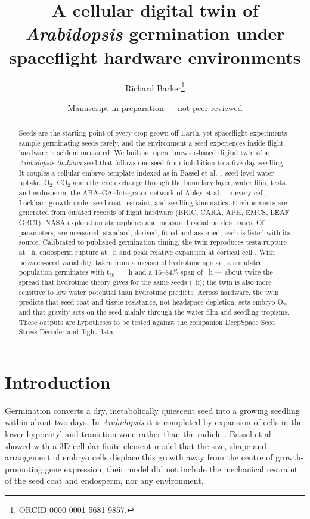 \documentclass[11pt]{article}
\title{A cellular digital twin of \emph{Arabidopsis} germination under spaceflight hardware environments}
\author{Richard Barker\thanks{ORCID 0000-0001-5681-9857. \todo{affiliation and correspondence address to be confirmed by the author}}}
\date{Manuscript in preparation --- not peer reviewed}
\begin{document}
\maketitle

\begin{abstract}
Seeds are the starting point of every crop grown off Earth, yet spaceflight experiments sample germinating seeds rarely, and the
environment a seed experiences inside flight hardware is seldom measured. We built an open, browser-based digital twin of an
\emph{Arabidopsis thaliana} seed that follows one seed from imbibition to a five-day seedling. It couples a cellular embryo template indexed as in Bassel
et al.~\citep{bassel2014}, seed-level water uptake, O$_2$, CO$_2$ and ethylene exchange through the boundary layer, water film,
testa and endosperm, the ABA--GA--Integrator network of Abley et al.~\citep{abley2021} in every cell, Lockhart growth under
seed-coat restraint, and seedling kinematics. Environments are generated from curated records of flight hardware (BRIC, CARA,
APH, EMCS, LEAF GBC1), NASA exploration atmospheres and measured radiation dose rates. Of \TierTotal{} parameters,
\TierMeasured{} are measured, \TierStandard{} standard, \TierDerived{} derived, \TierFitted{} fitted and \TierAssumed{} assumed; each
is listed with its source. Calibrated to published germination timing, the twin reproduces testa rupture at \FitTR{}~h, endosperm
rupture at \FitER{}~h and peak relative expansion at cortical cell \FitPeak{}. With between-seed variability taken from a measured
hydrotime spread, a simulated population germinates with t$_{50}$ = \PopGroundTfifty{}~h and a 16--84\% span of \PopGroundSpread{}~h --- about twice the
spread that hydrotime theory gives for the same seeds (\PopGroundHydSpread{}~h); the twin is also more sensitive to low water
potential than hydrotime predicts. Across hardware, the twin predicts that seed-coat and tissue resistance, not headspace depletion,
sets embryo O$_2$, and that gravity acts on the seed mainly through the water film and seedling tropisms. These outputs are hypotheses
to be tested against the companion DeepSpace Seed Stress Decoder and flight data.
\end{abstract}

\section{Introduction}
Germination converts a dry, metabolically quiescent seed into a growing seedling within about two days. In
\emph{Arabidopsis} it is completed by expansion of cells in the lower hypocotyl and transition zone rather than the radicle
\citep{sliwinska2009}. Bassel et al.~\citep{bassel2014} showed with a 3D cellular finite-element model that the size, shape and
arrangement of embryo cells displace this growth away from the centre of growth-promoting gene expression; their model did not
include the mechanical restraint of the seed coat and endosperm, nor any environment.
\end{document}
